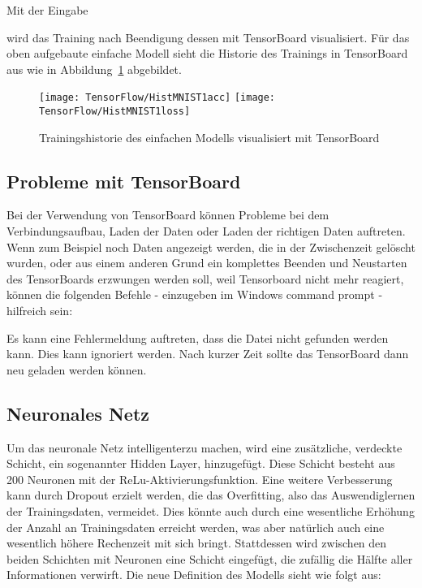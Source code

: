 Mit der Eingabe

\medskip


\medskip

wird das Training nach Beendigung dessen mit TensorBoard visualisiert. Für das oben aufgebaute einfache Modell sieht die Historie des Trainings in TensorBoard aus wie in Abbildung~\ref{HistMNIST1} abgebildet.

\begin{figure}[H]
	\begin{center}
		\texttt{[image: TensorFlow/HistMNIST1acc]}
		\texttt{[image: TensorFlow/HistMNIST1loss]}
		\caption{Trainingshistorie des einfachen Modells visualisiert mit TensorBoard} 
		\label{HistMNIST1}
	\end{center}
\end{figure}

\subsection{Probleme mit TensorBoard}

Bei der Verwendung von TensorBoard können Probleme bei dem Verbindungsaufbau, Laden der Daten oder Laden der \glqq richtigen\grqq{} Daten auftreten. Wenn zum Beispiel noch Daten angezeigt werden, die in der Zwischenzeit gelöscht wurden, oder aus einem anderen Grund ein komplettes Beenden und Neustarten des TensorBoards erzwungen werden soll, weil Tensorboard nicht mehr reagiert, können die folgenden Befehle - 
einzugeben im Windows command prompt - hilfreich sein:

\medskip




\medskip

Es kann eine Fehlermeldung auftreten, dass die Datei nicht gefunden werden kann. Dies kann ignoriert werden. Nach kurzer Zeit sollte das TensorBoard dann neu geladen werden können.

\subsection{Neuronales Netz}

Um das neuronale Netz \glqq intelligenter\grqq  zu machen, wird eine zusätzliche, verdeckte Schicht, ein
sogenannter Hidden Layer, hinzugefügt. Diese Schicht besteht aus 200 Neuronen mit der ReLu-Aktivierungsfunktion. Eine weitere Verbesserung kann durch Dropout erzielt werden, die das Overfitting, also das Auswendiglernen der Trainingsdaten, vermeidet. Dies könnte auch durch eine wesentliche Erhöhung der Anzahl an Trainingsdaten erreicht werden, was aber natürlich auch eine wesentlich höhere Rechenzeit mit sich bringt. Stattdessen wird zwischen den beiden Schichten mit Neuronen eine Schicht eingefügt, die zufällig die Hälfte aller Informationen verwirft. Die neue Definition des Modells sieht wie folgt aus:

